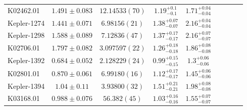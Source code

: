 \documentclass[a4paper,fleqn,usenatbib]{mnras}
\begin{document}
\begin{table*}
\begin{tabular}{lcccccccc}
K02462.01&	$1.491 \pm 0.083$	&$12.14533 (70)$        &$1.19^{+0.1}_{-0.1}$	&$1.71^{+0.04}_{-0.04}$	\\
Kepler-1274&$1.441 \pm 0.071$	&$ 6.98156 (21)$	     &$1.38^{+0.07}_{-0.07}$	&$2.16^{+0.04}_{-0.04}$	\\
Kepler-1298&$1.588 \pm 0.089$	&$ 7.12836 (47)$	     &$1.37^{+0.17}_{-0.17}$	&$2.16^{+0.07}_{-0.07}$	\\
K02706.01&	$1.797 \pm 0.082$	&$ 3.097597 (22)$	     &$1.26^{+0.18}_{-0.18}$	&$1.86^{+0.08}_{-0.08}$	\\
Kepler-1392&$0.684 \pm 0.052$	&$ 2.128229 (24)$	    &$0.99^{+0.15}_{-0.15}$	&$1.3^{+0.06}_{-0.06}$	\\
K02801.01&	$0.870 \pm 0.061$	&$ 6.99180 (16)$	  &$1.12^{+0.17}_{-0.17}$	&$1.45^{+0.06}_{-0.06}$	\\
Kepler-1394&$1.04 \pm 0.11$ 	&$ 3.93800 (32)$	  &$1.51^{+0.21}_{-0.21}$	&$1.98^{+0.08}_{-0.08}$	\\
K03168.01&	$0.988 \pm 0.076$	&$56.382 (45)$         &$1.03^{+0.16}_{-0.16}$	&$1.55^{+0.07}_{-0.07}$	\\
\end{tabular}
\end{table*}






%
%



\label{lastpage}
\end{document}
